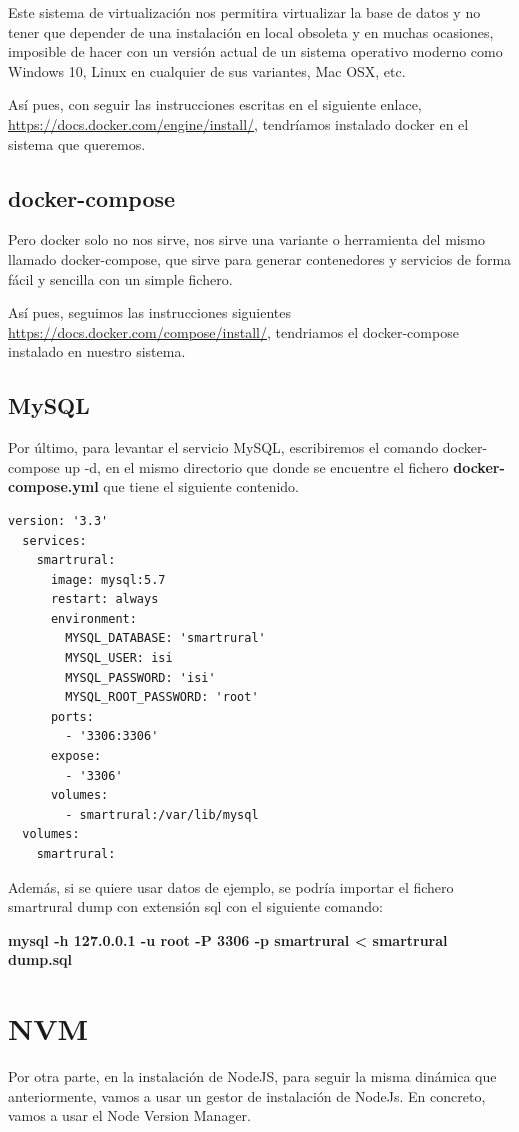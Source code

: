 \documentclass[a4paper,12pt]{article}
\begin{document}
Este sistema de virtualización nos permitira virtualizar la base de datos y no tener que depender de una instalación
en local obsoleta y en muchas ocasiones, imposible de hacer con un versión actual de un sistema operativo moderno como
Windows 10, Linux en cualquier de sus variantes, Mac OSX, etc.

Así pues, con seguir las instrucciones escritas en el siguiente enlace,
\url{https://docs.docker.com/engine/install/},
tendríamos instalado docker en el sistema que queremos.

\subsection{docker-compose}
Pero docker solo no nos sirve, nos sirve una variante o herramienta del mismo llamado docker-compose, que sirve
para generar contenedores y servicios de forma fácil y sencilla con un simple fichero.

Así pues, seguimos las instrucciones siguientes \url{https://docs.docker.com/compose/install/}, tendriamos el
docker-compose instalado en nuestro sistema.

\subsection{MySQL}
Por último, para levantar el servicio MySQL, escribiremos el comando docker-compose up -d, en el mismo directorio
que donde se encuentre el fichero \textbf{docker-compose.yml} que tiene el siguiente contenido.

\begin{lstlisting}[language=xml,caption=docker-compose.yml]
  version: '3.3'
  services:
    smartrural:
      image: mysql:5.7
      restart: always
      environment:
        MYSQL_DATABASE: 'smartrural'
        MYSQL_USER: isi
        MYSQL_PASSWORD: 'isi'
        MYSQL_ROOT_PASSWORD: 'root'
      ports:
        - '3306:3306'
      expose:
        - '3306'
      volumes:
        - smartrural:/var/lib/mysql
  volumes:
    smartrural:
\end{lstlisting}

Además, si se quiere usar datos de ejemplo, se podría importar el fichero smartrural dump
con extensión sql con el siguiente comando:

\textbf{mysql -h 127.0.0.1 -u root -P 3306 -p smartrural < smartrural dump.sql}

\section{NVM}
Por otra parte, en la instalación de NodeJS, para seguir la misma dinámica que anteriormente, vamos
a usar un gestor de instalación de NodeJs. En concreto, vamos a usar el Node Version Manager.
\end{document}
